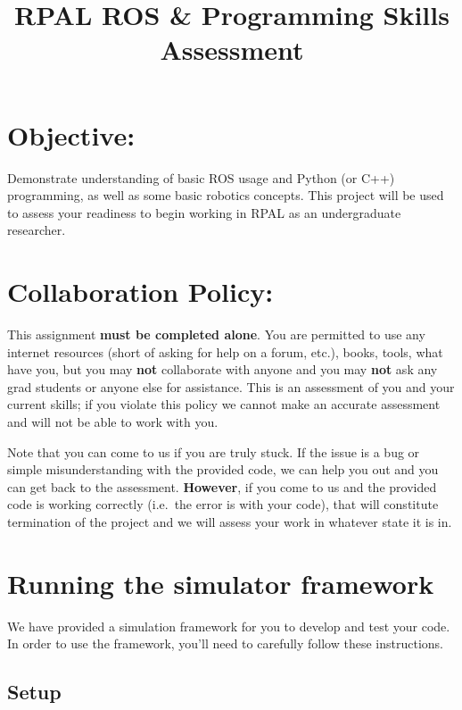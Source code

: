 \documentclass[11pt]{article}
\begin{document}
\title{RPAL ROS \& Programming Skills Assessment}
\date{}
\author{}

\maketitle

\section{Objective:} 

Demonstrate understanding of basic ROS usage and Python (or C++) programming, as well as some basic
robotics concepts. This project will be used to assess your readiness to begin working in RPAL as an
undergraduate researcher.

\section{Collaboration Policy:} 

This assignment \textbf{must be completed alone}. You are permitted to use any internet resources
(short of asking for help on a forum, etc.), books, tools, what have you, but you may \textbf{not}
collaborate with anyone and you may \textbf{not} ask any grad students or anyone else for
assistance. This is an assessment of you and your current skills; if you violate this policy we
cannot make an accurate assessment and will not be able to work with you.

Note that you can come to us if you are truly stuck. If the issue is a bug or simple
misunderstanding with the provided code, we can help you out and you can get back to the assessment.
\textbf{However}, if you come to us and the provided code is working correctly (i.e.\ the error is
with your code), that will constitute termination of the project and we will assess your work in
whatever state it is in.

\section{Running the simulator framework}

We have provided a simulation framework for you to develop and test your code. In order to use the
framework, you'll need to carefully follow these instructions.

\subsection{Setup}
\end{document}
